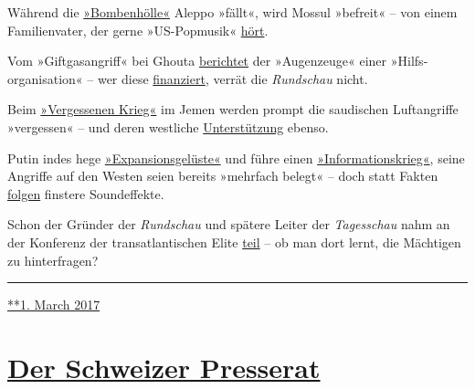 Während die
\href{https://www.srf.ch/sendungen/rundschau/subventionierte-piloten-vaeter-am-limit-bombenhoelle-aleppo}{»Bombenhölle«}
Aleppo »fällt«, wird Mossul »befreit« -- von einem Familien­vater, der
gerne »US-Popmusik«
\href{https://www.srf.ch/sendungen/rundschau/buben-beschneidung-michel-bollag-pkb-west-mossul}{hört}.

Vom »Giftgasangriff« bei Ghouta
\href{https://www.srf.ch/sendungen/rundschau/kriminaltouristen-verhuetungsmittel-j-bitzer-giftgaseinsatz}{berichtet}
der »Augen­zeuge« einer »Hilfs­organisation« -- wer diese
\href{http://www.uossm.org/who_we_are}{finanziert}, verrät die
\emph{Rundschau} nicht.

Beim
\href{https://www.srf.ch/sendungen/rundschau/gehorsam-und-ehelos-klamauk-statt-kompromiss-vergessener-krieg}{»Vergessenen
Krieg«} im Jemen werden prompt die saudischen Luftangriffe »vergessen«
-- und deren westliche
\href{https://www.strategic-culture.org/news/2018/06/18/western-media-whitewash-yemen-genocide.html}{Unterstützung}
ebenso.

Putin indes hege
\href{https://www.srf.ch/sendungen/rundschau/gianni-infantino-fatma-samoura-iv-kosovaren-zittern-vor-russen}{»Expansionsgelüste«}
und füh­re einen
\href{https://www.srf.ch/sendungen/rundschau/putins-informationskrieg-milliarden-jongleur-bastos-camorra}{»Informationskrieg«},
seine Angriffe auf den Westen seien bereits »mehrfach be­legt« -- doch
statt Fakten
\href{https://www.srf.ch/sendungen/rundschau/putins-informationskrieg-milliarden-jongleur-bastos-camorra}{folgen}
finstere Sound­effekte.

Schon der Gründer der \emph{Rundschau} und spätere Leiter der
\emph{Tagesschau} nahm an der Konferenz der trans­atlantischen Elite
\href{https://wikileaks.org/plusd/cables/1978ZURICH00660_d.html}{teil}
-- ob man dort lernt, die Mächtigen zu hinterfragen?

\begin{center}\rule{0.5\linewidth}{\linethickness}\end{center}

\href{https://swprs.org/2017/03/01/srf-rundschau/}{**1. March 2017}

\hypertarget{der-schweizer-presserat}{%
\section{\texorpdfstring{\href{https://swprs.org/2017/03/01/der-schweizer-presserat/}{Der
Schweizer
Presserat}}{Der Schweizer Presserat}}\label{der-schweizer-presserat}}

